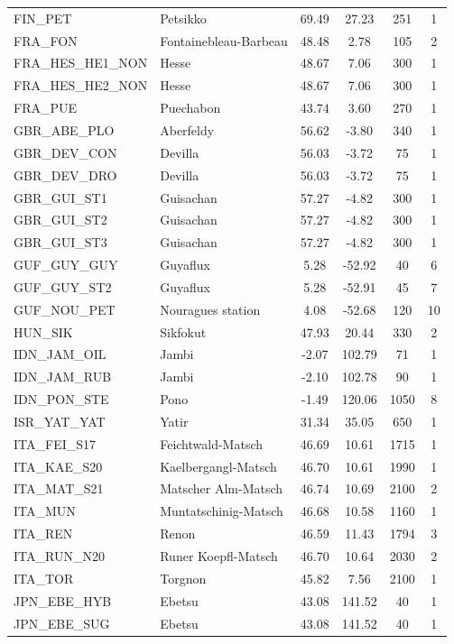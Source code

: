 \documentclass[11pt,twoside]{reedthesis}
\begin{document}
\begin{longtable}[t]{l>{\centering\arraybackslash}p{12em}cccc}
FIN\_PET & Petsikko & 69.49 & 27.23 & 251 & 1\\
FRA\_FON & Fontainebleau-Barbeau & 48.48 & 2.78 & 105 & 2\\
FRA\_HES\_HE1\_NON & Hesse & 48.67 & 7.06 & 300 & 1\\
FRA\_HES\_HE2\_NON & Hesse & 48.67 & 7.06 & 300 & 1\\
FRA\_PUE & Puechabon & 43.74 & 3.60 & 270 & 1\\
GBR\_ABE\_PLO & Aberfeldy & 56.62 & -3.80 & 340 & 1\\
GBR\_DEV\_CON & Devilla & 56.03 & -3.72 & 75 & 1\\
GBR\_DEV\_DRO & Devilla & 56.03 & -3.72 & 75 & 1\\
GBR\_GUI\_ST1 & Guisachan & 57.27 & -4.82 & 300 & 1\\
GBR\_GUI\_ST2 & Guisachan & 57.27 & -4.82 & 300 & 1\\
GBR\_GUI\_ST3 & Guisachan & 57.27 & -4.82 & 300 & 1\\
GUF\_GUY\_GUY & Guyaflux & 5.28 & -52.92 & 40 & 6\\
GUF\_GUY\_ST2 & Guyaflux & 5.28 & -52.91 & 45 & 7\\
GUF\_NOU\_PET & Nouragues station & 4.08 & -52.68 & 120 & 10\\
HUN\_SIK & Sikfokut & 47.93 & 20.44 & 330 & 2\\
IDN\_JAM\_OIL & Jambi & -2.07 & 102.79 & 71 & 1\\
IDN\_JAM\_RUB & Jambi & -2.10 & 102.78 & 90 & 1\\
IDN\_PON\_STE & Pono & -1.49 & 120.06 & 1050 & 8\\
ISR\_YAT\_YAT & Yatir & 31.34 & 35.05 & 650 & 1\\
ITA\_FEI\_S17 & Feichtwald-Matsch & 46.69 & 10.61 & 1715 & 1\\
ITA\_KAE\_S20 & Kaelbergangl-Matsch & 46.70 & 10.61 & 1990 & 1\\
ITA\_MAT\_S21 & Matscher Alm-Matsch & 46.74 & 10.69 & 2100 & 2\\
ITA\_MUN & Muntatschinig-Matsch & 46.68 & 10.58 & 1160 & 1\\
ITA\_REN & Renon & 46.59 & 11.43 & 1794 & 3\\
ITA\_RUN\_N20 & Runer Koepfl-Matsch & 46.70 & 10.64 & 2030 & 2\\
ITA\_TOR & Torgnon & 45.82 & 7.56 & 2100 & 1\\
JPN\_EBE\_HYB & Ebetsu & 43.08 & 141.52 & 40 & 1\\
JPN\_EBE\_SUG & Ebetsu & 43.08 & 141.52 & 40 & 1\\

\end{longtable}
\end{document}
